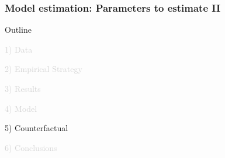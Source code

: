 \documentclass[aspectratio=169]{beamer}
\begin{document}

\begin{frame}
\frametitle{\textbf{Model estimation}: Parameters to estimate II} \label{parameters2}

\begin{center}
    \footnotesize
    
\end{center}

\end{frame}


\begin{frame}[noframenumbering]{Outline}

\Large

\textcolor{lightgray}{1) Data}

\vspace{5mm}

\textcolor{lightgray}{2) Empirical Strategy}

\vspace{5mm}

\textcolor{lightgray}{3) Results}

\vspace{5mm}

\textcolor{lightgray}{4) Model}

\vspace{5mm}

5) Counterfactual

\vspace{5mm}

\textcolor{lightgray}{6) Conclusions}

\end{frame}

\end{document}
